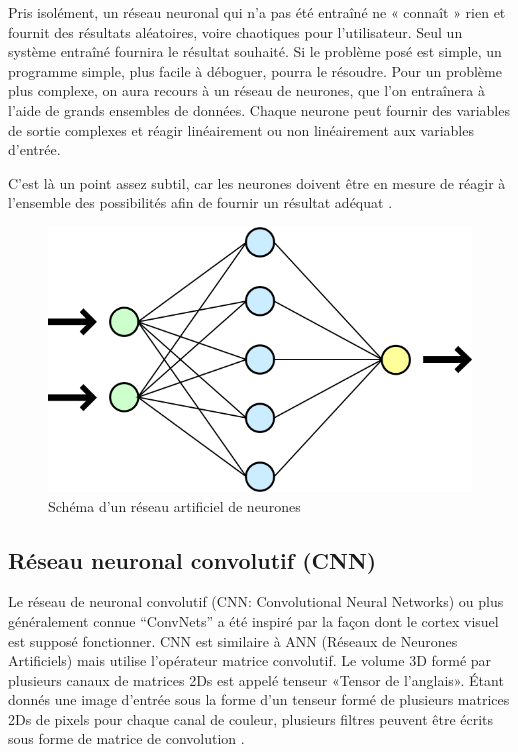 \documentclass[12pt]{article}
\begin{document}
Pris isolément, un réseau neuronal qui n’a pas été entraîné ne « connaît » rien et fournit des résultats aléatoires, voire chaotiques pour l’utilisateur. Seul un système entraîné fournira le résultat souhaité. Si le problème posé est simple, un programme simple, plus facile à déboguer, pourra le résoudre. Pour un problème plus complexe, on aura recours à un réseau de neurones, que l’on entraînera à l’aide de grands ensembles de données. Chaque neurone peut fournir des variables de sortie complexes et réagir linéairement ou non linéairement aux variables d'entrée.

C'est là un point assez subtil, car les neurones doivent être en mesure de réagir à l’ensemble des possibilités afin de fournir un résultat adéquat \cite{10}.
\begin{figure}[h]
\centering
\includegraphics[width=13cm]{img-Chapiter-1/shemadenourone.png}
\caption{Schéma d’un réseau artificiel de neurones}
\end{figure}

\subsection{Réseau neuronal convolutif (CNN)}
Le réseau de neuronal convolutif (CNN: Convolutional Neural Networks) ou plus généralement connue “ConvNets” a été inspiré par la façon dont le cortex visuel est supposé fonctionner. CNN est similaire à ANN (Réseaux de Neurones Artificiels) mais utilise l’opérateur matrice convolutif. Le volume 3D formé par plusieurs canaux de matrices 2Ds est appelé tenseur «Tensor de l’anglais». Étant donnés une image d'entrée sous la forme d'un tenseur formé de plusieurs matrices 2Ds de pixels pour chaque canal de couleur, plusieurs filtres peuvent être écrits sous forme de matrice de convolution \cite{42}.
\end{document}
